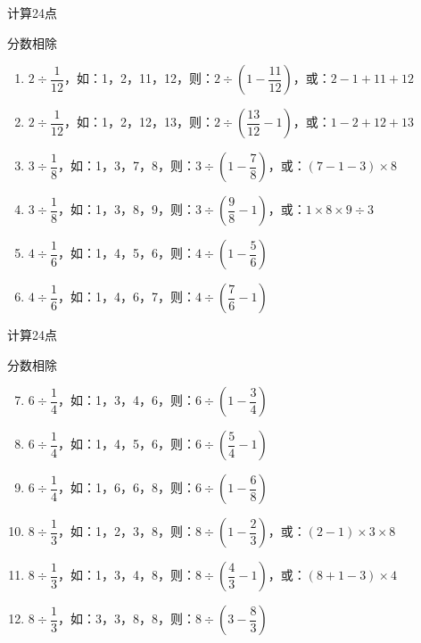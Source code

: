 \documentclass[aspectratio=169]{ctexbeamer} %
\begin{document}
\begin{frame}[t]{计算24点}
\begin{spacing}{2.0}
\normalsize
\alert{分数相除}
\begin{enumerate}[label={\arabic*.}]
\item $2 \div \dfrac{1}{12}$，如：1，2，11，12，则：$2 \div (1- \dfrac{11}{12})$，或：$2 - 1 + 11 + 12$
\item $2 \div \dfrac{1}{12}$，如：1，2，12，13，则：$2 \div (\dfrac{13}{12} - 1)$，或：$1 - 2 + 12 + 13$
\item $3 \div \dfrac{1}{8}$，如：1，3，7，8，则：$3 \div (1 - \dfrac{7}{8})$，或：$(7 - 1 - 3) \times 8$
\item $3 \div \dfrac{1}{8}$，如：1，3，8，9，则：$3 \div (\dfrac{9}{8} - 1)$，或：$1 \times 8 \times 9 \div 3$
\item $4 \div \dfrac{1}{6}$，如：1，4，5，6，则：$4 \div (1 - \dfrac{5}{6})$
\item $4 \div \dfrac{1}{6}$，如：1，4，6，7，则：$4 \div (\dfrac{7}{6} - 1)$
\end{enumerate}
\end{spacing}
\end{frame}

\begin{frame}[t]{计算24点}
\begin{spacing}{2.0}
\normalsize
\alert{分数相除}
\begin{enumerate}[label={\arabic*.}]
\setcounter{enumi}{6}
\item $6 \div \dfrac{1}{4}$，如：1，3，4，6，则：$6 \div (1- \dfrac{3}{4})$
\item $6 \div \dfrac{1}{4}$，如：1，4，5，6，则：$6 \div (\dfrac{5}{4} - 1)$
\item $6 \div \dfrac{1}{4}$，如：1，6，6，8，则：$6 \div (1- \dfrac{6}{8})$
\item $8 \div \dfrac{1}{3}$，如：1，2，3，8，则：$8 \div (1 - \dfrac{2}{3})$，或：$(2 - 1) \times 3 \times 8$
\item $8 \div \dfrac{1}{3}$，如：1，3，4，8，则：$8 \div (\dfrac{4}{3} - 1)$，或：$(8 + 1 - 3) \times 4$
\item $8 \div \dfrac{1}{3}$，如：3，3，8，8，则：$8 \div (3 - \dfrac{8}{3})$
\end{enumerate}
\end{spacing}
\end{frame}
\end{document}
